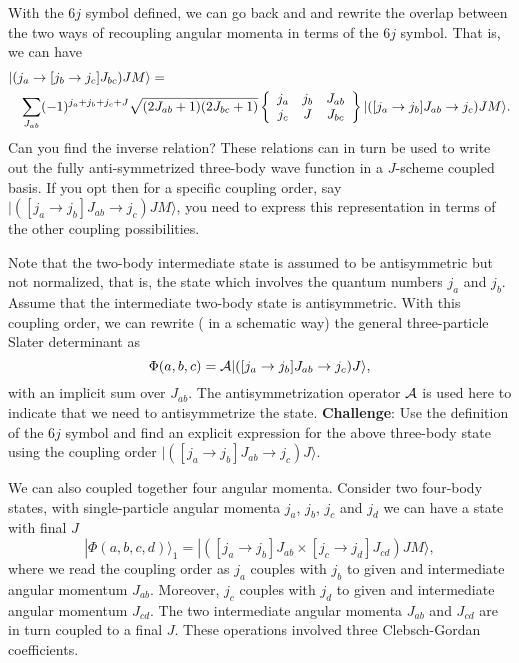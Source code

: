 \documentclass[graybox,sectrefs,envcountresetchap,open=right]{svmonodo}
\begin{document}
With the $6j$ symbol defined, we can go back and and rewrite the overlap between the two ways of recoupling angular momenta in terms of the $6j$ symbol.
That is, we can have  
\begin{eqnarray}
\nonumber
\lefteqn{| (j_a\rightarrow [j_b\rightarrow j_c]J_{bc}) JM\rangle = } \\
\nonumber
& &\sum_{J_{ab}}(-1)^{j_a+j_b+j_c+J}\sqrt{(2J_{ab}+1)(2J_{bc}+1)}\left\{\begin{array}{ccc} j_a & j_b& J_{ab} \\ j_c & J & J_{bc} \end{array}\right\}| ([j_a\rightarrow j_b]J_{ab}\rightarrow j_c) JM\rangle
. \nonumber
\end{eqnarray}
Can you find the inverse relation?  
These relations can in turn be used to write out the fully anti-symmetrized three-body wave function in a $J$-scheme coupled basis. 
If you opt then for a specific coupling order, say $| ([j_a\rightarrow j_b]J_{ab}\rightarrow j_c) JM\rangle$, you need to express this representation in terms of the other coupling possibilities. 





Note that the two-body intermediate state is assumed to be antisymmetric but
not normalized, that is, the state which involves the quantum numbers 
$j_a$ and $j_b$. Assume that the intermediate 
two-body state is antisymmetric. With this coupling order, we can 
rewrite ( in a schematic way) the general three-particle Slater determinant as 
\[
\Phi(a,b,c) = {\cal A} | ([j_a\rightarrow j_b]J_{ab}\rightarrow j_c) J\rangle, 
\]
with an implicit sum over $J_{ab}$.  The antisymmetrization operator ${\cal A}$ is used here to indicate that we need to antisymmetrize the state. \textbf{Challenge}: Use the definition of the $6j$ symbol and find an explicit 
expression for the above three-body state using the coupling order $| ([j_a\rightarrow j_b]J_{ab}\rightarrow j_c) J\rangle$.






We can also coupled together four angular momenta. Consider two four-body states, with single-particle angular momenta $j_a$, $j_b$, $j_c$ and $j_d$ we can have a state with final $J$
\[
|\Phi(a,b,c,d)\rangle_1 = | ([j_a\rightarrow j_b]J_{ab}\times [j_c\rightarrow j_d]J_{cd}) JM\rangle, 
\]
where we read the coupling order as $j_a$ couples with $j_b$ to given and intermediate angular momentum $J_{ab}$. 
Moreover, $j_c$ couples with $j_d$ to given and intermediate angular momentum $J_{cd}$.  The two intermediate angular momenta $J_{ab}$ and $J_{cd}$
are in turn coupled to a final $J$.  These operations involved three Clebsch-Gordan coefficients. 
\end{document}

